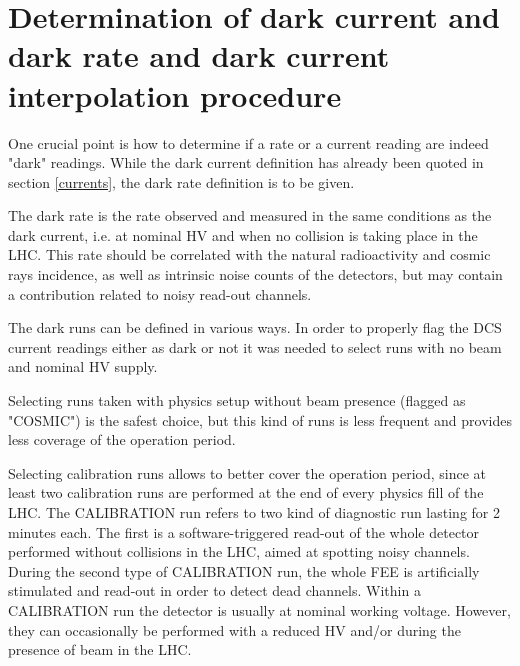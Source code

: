 \section{Determination of dark current and dark rate and dark current interpolation procedure}
One crucial point is how to determine if a rate or a current reading are indeed "dark" readings.
While the dark current definition has already been quoted in section \ref{currents}, the dark rate definition is to be given.

The dark rate is the rate observed and measured in the same conditions as the dark current, i.e. at nominal HV and when no collision is taking place in the LHC.
This rate should be correlated with the natural radioactivity and cosmic rays incidence, as well as intrinsic noise counts of the detectors, but may contain a contribution related to noisy read-out channels.

The dark runs can be defined in various ways.
In order to properly flag the DCS current readings either as dark or not it was needed to select runs with no beam and nominal HV supply.

Selecting runs taken with physics setup without beam presence (flagged as "COSMIC") is the safest choice, but this kind of runs is less frequent and provides less coverage of the operation period.

Selecting calibration runs allows to better cover the operation period, since at least two calibration runs are performed at the end of every physics fill of the LHC.
The CALIBRATION run refers to two kind of diagnostic run lasting for 2 minutes each.
The first is a software-triggered read-out of the whole detector performed without collisions in the LHC, aimed at spotting noisy channels.
During the second type of CALIBRATION run, the whole FEE is artificially stimulated and read-out in order to detect dead channels.
Within a CALIBRATION run the detector is usually at nominal working voltage.
However, they can occasionally be performed with a reduced HV and/or during the presence of beam in the LHC.

